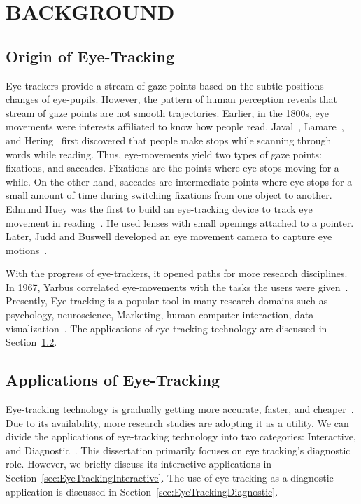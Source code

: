 \chapter{BACKGROUND}
\label{chap:Foundations}
\section{Origin of Eye-Tracking}
Eye-trackers provide a stream of gaze points based on the subtle positions changes of eye-pupils. However, the pattern of human perception reveals that stream of gaze points are not smooth trajectories. Earlier, in the 1800s, eye movements were interests affiliated to know how people read.  Javal~\cite{javal1878essai}, Lamare~\cite{lamare1893mouvements}, and  Hering~\cite{hering1879raumsinn} first discovered that people make stops while scanning through words while reading. Thus, eye-movements yield two types of gaze points: fixations, and saccades. Fixations are the points where eye stops moving for a while. On the other hand, saccades are intermediate points where eye stops for a small amount of time during switching fixations from one object to another. Edmund Huey was the first to build an eye-tracking device to track eye movement in reading~\cite{huey1908psychology}. He used lenses with small openings attached to a pointer. Later, Judd and Buswell developed an eye movement camera to capture eye motions~\cite{judd1922silent}. 

With the progress of eye-trackers, it opened paths for more research disciplines. In 1967, Yarbus correlated eye-movements with the tasks the users were given~\cite{yarbus1967eye}. Presently, Eye-tracking is a popular tool in many research domains such as psychology, neuroscience, Marketing, human-computer interaction, data visualization~\cite{Duch02}. The applications of eye-tracking technology are discussed in Section~\ref{sec:EyeTrackingApplication}.



\section{Applications of Eye-Tracking}
\label{sec:EyeTrackingApplication}
Eye-tracking technology is gradually getting more accurate, faster, and cheaper~\cite{Duch07}. Due to its availability, more research studies are adopting it as a utility. We can divide the applications of eye-tracking technology into two categories: Interactive, and Diagnostic~\cite{Duch02}. This dissertation primarily focuses on eye tracking's diagnostic role. However, we briefly discuss its interactive applications in Section~\ref{sec:EyeTrackingInteractive}. The use of eye-tracking as a diagnostic application is discussed in Section~\ref{sec:EyeTrackingDiagnostic}. 

